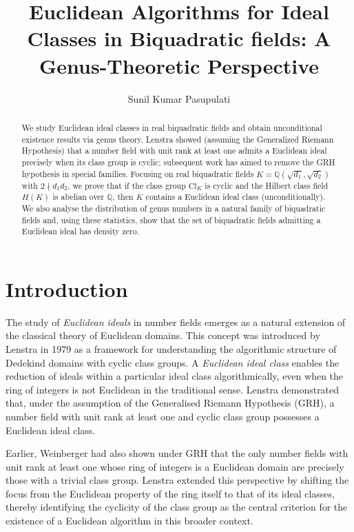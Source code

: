 \documentclass[12 pt]{amsart}
\title[Euclidean Algorithms for Ideal Classes in Biquadratic fields]{Euclidean Algorithms for Ideal Classes in Biquadratic fields: A Genus-Theoretic Perspective }
\author{Sunil Kumar Pasupulati}
\theoremstyle{definition}
\theoremstyle{remark}
\begin{document}
	\maketitle

\begin{abstract}
We study Euclidean ideal classes in real biquadratic fields and obtain unconditional existence results via genus theory. Lenstra showed (assuming the Generalized Riemann Hypothesis) that a number field with unit rank at least one admits a Euclidean ideal precisely when its class group is cyclic; subsequent work has aimed to remove the GRH hypothesis in special families. Focusing on real biquadratic fields  $K=\mathbb{Q}\left(\sqrt{d_1},\sqrt{d_2}\right)$
with $2\nmid d_1d_2$, we prove that if the class group $\mathrm{Cl}_K$ is cyclic and the Hilbert class field $H(K)$ is abelian over $\mathbb{Q}$, then $K$ contains a Euclidean ideal class (unconditionally). We also analyse the distribution of genus numbers in a natural family of biquadratic fields and, using these statistics, show that the set of biquadratic fields admitting a Euclidean ideal has density zero.
\end{abstract}


\section{Introduction}
The study of \emph{Euclidean ideals} in number fields emerges as a natural extension of the classical theory of Euclidean domains. This concept was introduced by Lenstra\cite{Len79} in 1979 as a framework for understanding the algorithmic structure of Dedekind domains with cyclic class groups. A \emph{Euclidean ideal class} enables the reduction of ideals within a particular ideal class algorithmically, even when the ring of integers is not Euclidean in the traditional sense. Lenstra demonstrated that, under the assumption of the Generalised Riemann Hypothesis (GRH), a number field with unit rank at least one and cyclic class group possesses a Euclidean ideal class.

Earlier, Weinberger \cite{Wei72} had also shown under GRH that the only number fields with unit rank at least one whose ring of integers is a Euclidean domain are precisely those with a trivial class group. Lenstra extended this perspective by shifting the focus from the Euclidean property of the ring itself to that of its ideal classes, thereby identifying the cyclicity of the class group as the central criterion for the existence of a Euclidean algorithm in this broader context.
\end{document}
